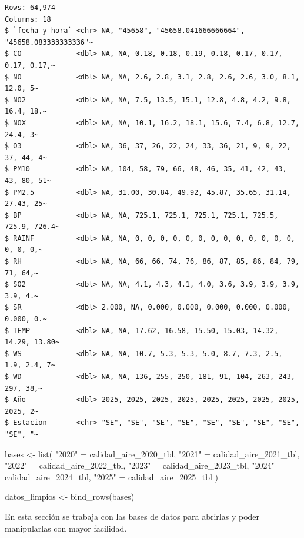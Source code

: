 \documentclass[
  letterpaper,
  DIV=11,
  numbers=noendperiod]{scrartcl}
\newenvironment{Shaded}{\begin{snugshade}}{\end{snugshade}}
\newcommand{\FunctionTok}[1]{\textcolor[rgb]{0.28,0.35,0.67}{#1}}
\newcommand{\NormalTok}[1]{\textcolor[rgb]{0.00,0.23,0.31}{#1}}
\newcommand{\OtherTok}[1]{\textcolor[rgb]{0.00,0.23,0.31}{#1}}
\newcommand{\StringTok}[1]{\textcolor[rgb]{0.13,0.47,0.30}{#1}}
\begin{document}
\begin{verbatim}
Rows: 64,974
Columns: 18
$ `fecha y hora` <chr> NA, "45658", "45658.041666666664", "45658.083333333336"~
$ CO             <dbl> NA, NA, 0.18, 0.18, 0.19, 0.18, 0.17, 0.17, 0.17, 0.17,~
$ NO             <dbl> NA, NA, 2.6, 2.8, 3.1, 2.8, 2.6, 2.6, 3.0, 8.1, 12.0, 5~
$ NO2            <dbl> NA, NA, 7.5, 13.5, 15.1, 12.8, 4.8, 4.2, 9.8, 16.4, 18.~
$ NOX            <dbl> NA, NA, 10.1, 16.2, 18.1, 15.6, 7.4, 6.8, 12.7, 24.4, 3~
$ O3             <dbl> NA, 36, 37, 26, 22, 24, 33, 36, 21, 9, 9, 22, 37, 44, 4~
$ PM10           <dbl> NA, 104, 58, 79, 66, 48, 46, 35, 41, 42, 43, 43, 80, 51~
$ PM2.5          <dbl> NA, 31.00, 30.84, 49.92, 45.87, 35.65, 31.14, 27.43, 25~
$ BP             <dbl> NA, NA, 725.1, 725.1, 725.1, 725.1, 725.5, 725.9, 726.4~
$ RAINF          <dbl> NA, NA, 0, 0, 0, 0, 0, 0, 0, 0, 0, 0, 0, 0, 0, 0, 0, 0,~
$ RH             <dbl> NA, NA, 66, 66, 74, 76, 86, 87, 85, 86, 84, 79, 71, 64,~
$ SO2            <dbl> NA, NA, 4.1, 4.3, 4.1, 4.0, 3.6, 3.9, 3.9, 3.9, 3.9, 4.~
$ SR             <dbl> 2.000, NA, 0.000, 0.000, 0.000, 0.000, 0.000, 0.000, 0.~
$ TEMP           <dbl> NA, NA, 17.62, 16.58, 15.50, 15.03, 14.32, 14.29, 13.80~
$ WS             <dbl> NA, NA, 10.7, 5.3, 5.3, 5.0, 8.7, 7.3, 2.5, 1.9, 2.4, 7~
$ WD             <dbl> NA, NA, 136, 255, 250, 181, 91, 104, 263, 243, 297, 38,~
$ Año            <dbl> 2025, 2025, 2025, 2025, 2025, 2025, 2025, 2025, 2025, 2~
$ Estacion       <chr> "SE", "SE", "SE", "SE", "SE", "SE", "SE", "SE", "SE", "~
\end{verbatim}

\begin{Shaded}
\begin{Highlighting}[]
\NormalTok{bases }\OtherTok{\textless{}{-}} \FunctionTok{list}\NormalTok{(}
  \StringTok{"2020"} \OtherTok{=}\NormalTok{ calidad\_aire\_2020\_tbl,}
  \StringTok{"2021"} \OtherTok{=}\NormalTok{ calidad\_aire\_2021\_tbl,}
  \StringTok{"2022"} \OtherTok{=}\NormalTok{ calidad\_aire\_2022\_tbl,}
  \StringTok{"2023"} \OtherTok{=}\NormalTok{ calidad\_aire\_2023\_tbl,}
  \StringTok{"2024"} \OtherTok{=}\NormalTok{ calidad\_aire\_2024\_tbl,}
  \StringTok{"2025"} \OtherTok{=}\NormalTok{ calidad\_aire\_2025\_tbl}
\NormalTok{)}

\NormalTok{datos\_limpios }\OtherTok{\textless{}{-}} \FunctionTok{bind\_rows}\NormalTok{(bases)}
\end{Highlighting}
\end{Shaded}

En esta sección se trabaja con las bases de datos para abrirlas y poder
manipularlas con mayor facilidad.
\end{document}
